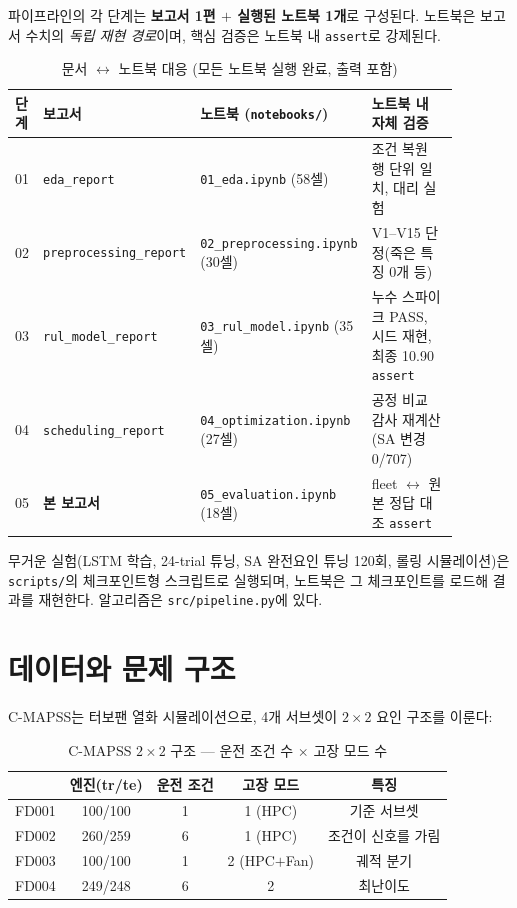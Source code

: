 \documentclass[11pt]{article}
\begin{document}
파이프라인의 각 단계는 \textbf{보고서 1편 $+$ 실행된 노트북 1개}로 구성된다.
노트북은 보고서 수치의 \emph{독립 재현 경로}이며, 핵심 검증은 노트북 내 \texttt{assert}로 강제된다.

\begin{table}[H]
\centering\small
\caption{문서 $\leftrightarrow$ 노트북 대응 (모든 노트북 실행 완료, 출력 포함)}
\label{tab:map}
\begin{tabular}{p{0.05\linewidth}p{0.19\linewidth}p{0.21\linewidth}p{0.43\linewidth}}
\toprule
단계 & 보고서 & 노트북 (\texttt{notebooks/}) & 노트북 내 자체 검증 \\
\midrule
01 & \texttt{eda\_report} & \texttt{01\_eda.ipynb} (58셀) & 조건 복원 행 단위 일치, 대리 실험 \\
02 & \texttt{preprocessing\_report} & \texttt{02\_preprocessing.ipynb} (30셀) & V1--V15 단정(죽은 특징 0개 등) \\
03 & \texttt{rul\_model\_report} & \texttt{03\_rul\_model.ipynb} (35셀) & 누수 스파이크 PASS, 시드 재현, 최종 10.90 \texttt{assert} \\
04 & \texttt{scheduling\_report} & \texttt{04\_optimization.ipynb} (27셀) & 공정 비교 감사 재계산(SA 변경 0/707) \\
05 & \textbf{본 보고서} & \texttt{05\_evaluation.ipynb} (18셀) & fleet $\leftrightarrow$ 원본 정답 대조 \texttt{assert} \\
\bottomrule
\end{tabular}
\end{table}

무거운 실험(LSTM 학습, 24-trial 튜닝, SA 완전요인 튜닝 120회, 롤링 시뮬레이션)은
\texttt{scripts/}의 체크포인트형 스크립트로 실행되며, 노트북은 그 체크포인트를 로드해 결과를 재현한다.
알고리즘은 \texttt{src/pipeline.py}에 있다.

\section{데이터와 문제 구조}

C-MAPSS는 터보팬 열화 시뮬레이션으로, 4개 서브셋이 $2{\times}2$ 요인 구조를 이룬다:

\begin{table}[H]
\centering
\caption{C-MAPSS $2{\times}2$ 구조 — 운전 조건 수 $\times$ 고장 모드 수}
\begin{tabular}{lcccc}
\toprule
 & 엔진(tr/te) & 운전 조건 & 고장 모드 & 특징 \\
\midrule
FD001 & 100/100 & 1 & 1 (HPC) & 기준 서브셋 \\
FD002 & 260/259 & 6 & 1 (HPC) & 조건이 신호를 가림 \\
FD003 & 100/100 & 1 & 2 (HPC$+$Fan) & 궤적 분기 \\
FD004 & 249/248 & 6 & 2 & 최난이도 \\
\bottomrule
\end{tabular}
\end{table}
\end{document}
